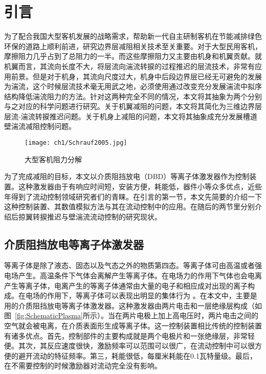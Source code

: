 \chapter{引言}
\label{cha:intro}

为了配合我国大型客机发展的战略需求，帮助新一代自主研制客机在节能减排绿色环保的道路上顺利前进，研究边界层减阻相关技术至关重要。对于大型民用客机，摩擦阻力几乎占到了总阻力的一半\cite{Schrauf2005}。而这些摩擦阻力又主要由机身和机翼贡献。就机翼而言，其流向长度不大，将层流向湍流转捩的过程推迟的层流技术，非常有应用前景\cite{Joslin1998}。但是对于机身，其流向尺度过大，机身中后段边界层已经无可避免的发展为湍流，这个时候层流技术毫无用武之地，必须使用通过改变充分发展湍流中拟序结构降低湍流阻力的方法。针对这两种完全不同的情况，本文将其抽象为两个分别与之对应的科学问题进行研究。关于机翼减阻的问题，本文将其简化为三维边界层层流-湍流转捩推迟问题。关于机身上减阻的问题，本文将其抽象成充分发展槽道壁湍流减阻控制问题。
\begin{figure}[htb]
  \centering
  \texttt{[image: ch1/Schrauf2005.jpg]}
  \caption{大型客机阻力分解\cite{Schrauf2005}}\label{f:Schrauf2005}
\end{figure}

为了完成减阻的目标，本文以介质阻挡放电（DBD）等离子体激发器作为控制装置。这种激发器由于有响应时间短，安装方便，耗能低，器件小等众多优点，近些年得到了流动控制领域研究者们的青睐。在引言的第一节，本文先简要的介绍一下这种控制装置、其数值模拟方法与其在流动控制中的应用。在随后的两节里分别介绍后掠翼转捩推迟与壁湍流流动控制的研究现状。


\section{介质阻挡放电等离子体激发器}

等离子体是除了液态、固态以及气态之外的物质第四态\cite{zhangguling2008,niewanshang2012}。等离子体可由高温或者强电场产生。高温条件下气体会离解产生等离子体。在电场力的作用下气体也会电离产生等离子体，电离产生的等离子体通常由大量的电子和相应成对出现的离子构成。在电场的作用下，等离子体可以表现出明显的集体行为
\cite{wuhong2015}。在本文中，主要是用的介质阻挡放电等离子体激发器。这种激发器由两片电击和一层绝缘层构成（如图~\ref{fig:SchematicPlasma}所示）。当在两片电极上加上高电压时，两片电击之间的空气就会被电离，在介质表面形生成等离子体。这一控制装置相比传统的控制装置有诸多优点\cite{Corke2010}。首先，控制部件的主要构成就是两个电极片和一张绝缘层，非常轻便。其次，其反应速度很快，激励频率可以范围可以很广，在流动控制中可以很方便的避开流动的特征频率。第三，耗能很低，每厘米耗能在0.1瓦特量级。最后，在不需要控制的时候激励器对流动完全没有影响。


